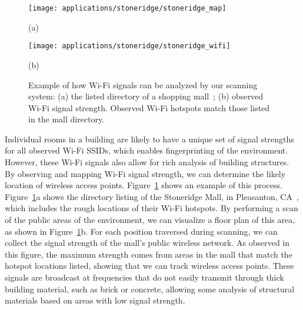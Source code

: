 \documentclass[12pt,onecolumn,oneside]{book}
\begin{document}
\begin{figure}[t]

	\begin{minipage}[t]{0.9\linewidth}
		\centerline{\texttt{[image: applications/stoneridge/stoneridge\_map]}}
		\centerline{(a)}
	\end{minipage}
	 
	\begin{minipage}[t]{0.9\linewidth}
		\centerline{\texttt{[image: applications/stoneridge/stoneridge\_wifi]}}
		\centerline{(b)}
	\end{minipage}
	
	\caption[Analysis of Wi-Fi signals in scans.]{Example of how Wi-Fi signals can be analyzed by our scanning system: (a) the listed directory of a shopping mall~\cite{Stoneridge}; (b) observed Wi-Fi signal strength.  Observed Wi-Fi hotspots match those listed in the mall directory.}
	\label{fig:stoneridge_wifi}
\end{figure}

Individual rooms in a building are likely to have a unique set of signal strengths for all observed Wi-Fi SSIDs, which enables fingerprinting of the environment.  However, these Wi-Fi signals also allow for rich analysis of building structures.  By observing and mapping Wi-Fi signal strength, we can determine the likely location of wireless access points.  Figure~\ref{fig:stoneridge_wifi} shows an example of this process.  Figure~\ref{fig:stoneridge_wifi}a shows the directory listing of the Stoneridge Mall, in Pleasanton, CA~\cite{Stoneridge}, which includes the rough locations of their Wi-Fi hotspots.  By performing a scan of the public areas of the environment, we can visualize a floor plan of this area, as shown in Figure~\ref{fig:stoneridge_wifi}b.  For each position traversed during scanning, we can collect the signal strength of the mall's public wireless network.  As observed in this figure, the maximum strength comes from areas in the mall that match the hotspot locations listed, showing that we can track wireless access points.  These signals are broadcast at frequencies that do not easily transmit through thick building material, such as brick or concrete, allowing some analysis of structural materials based on areas with low signal strength.

\end{document}
